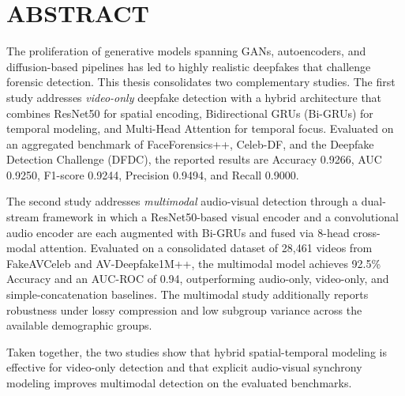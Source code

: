 \section*{ABSTRACT}
\noindent{\rule{\textwidth}{1.5pt}}

The proliferation of generative models spanning GANs, autoencoders, and diffusion-based pipelines has led to highly realistic deepfakes that challenge forensic detection. This thesis consolidates two complementary studies. The first study addresses \textit{video-only} deepfake detection with a hybrid architecture that combines ResNet50 for spatial encoding, Bidirectional GRUs (Bi-GRUs) for temporal modeling, and Multi-Head Attention for temporal focus. Evaluated on an aggregated benchmark of FaceForensics++, Celeb-DF, and the Deepfake Detection Challenge (DFDC), the reported results are Accuracy 0.9266, AUC 0.9250, F1-score 0.9244, Precision 0.9494, and Recall 0.9000.

The second study addresses \textit{multimodal} audio-visual detection through a dual-stream framework in which a ResNet50-based visual encoder and a convolutional audio encoder are each augmented with Bi-GRUs and fused via 8-head cross-modal attention. Evaluated on a consolidated dataset of 28{,}461 videos from FakeAVCeleb and AV-Deepfake1M++, the multimodal model achieves 92.5\% Accuracy and an AUC-ROC of 0.94, outperforming audio-only, video-only, and simple-concatenation baselines. The multimodal study additionally reports robustness under lossy compression and low subgroup variance across the available demographic groups.

Taken together, the two studies show that hybrid spatial-temporal modeling is effective for video-only detection and that explicit audio-visual synchrony modeling improves multimodal detection on the evaluated benchmarks.